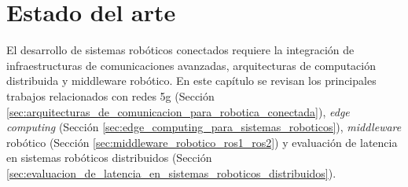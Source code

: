 \section{Estado del arte}
\label{sec:estado_del_arte}

El desarrollo de sistemas robóticos conectados requiere la integración de infraestructuras de comunicaciones avanzadas, arquitecturas de computación distribuida y middleware robótico. En este capítulo se revisan los principales trabajos relacionados con redes \gls{5g} (Sección \ref{sec:arquitecturas_de_comunicacion_para_robotica_conectada}), \textit{edge computing} (Sección \ref{sec:edge_computing_para_sistemas_roboticos}), \textit{middleware} robótico (Sección \ref{sec:middleware_robotico_ros1_ros2}) y evaluación de latencia en sistemas robóticos distribuidos (Sección \ref{sec:evaluacion_de_latencia_en_sistemas_roboticos_distribuidos}).